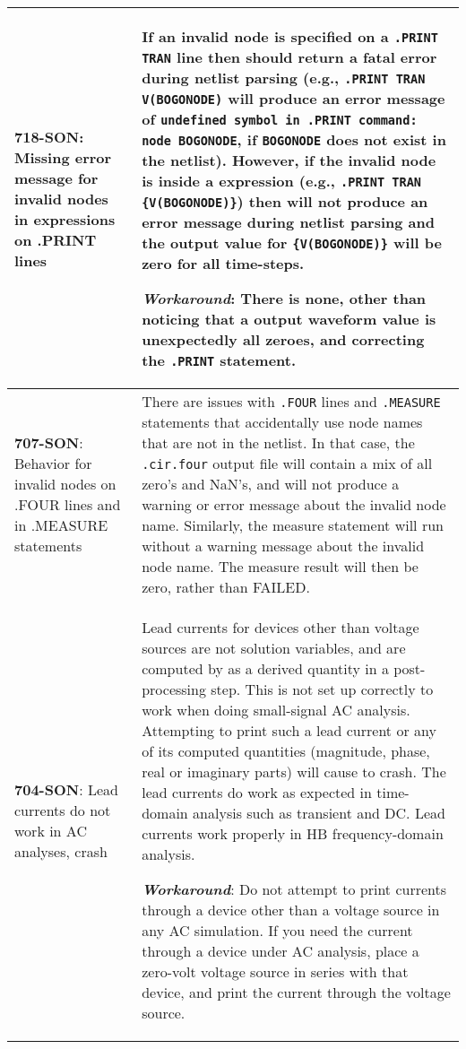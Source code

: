 {\begin{longtable}[h] {>{\raggedright\small}m{2in}|>{\raggedright\let\\\tabularnewline\small}m{3.5in}}
\textbf{718-SON}: Missing error message for invalid nodes in expressions on .PRINT lines & If an invalid node
is specified on a \Xyce{} \texttt{.PRINT TRAN} line then \Xyce{} should return a fatal error during netlist
parsing (e.g., \texttt{.PRINT TRAN V(BOGONODE)} will produce an error message of \texttt{undefined 
symbol in .PRINT command: node BOGONODE}, if \texttt{BOGONODE} does not exist in the netlist).  However, if the
invalid node is inside a \Xyce{} expression (e.g., \texttt{.PRINT TRAN \{V(BOGONODE)\}}) then \Xyce{} will 
not produce an error message during netlist parsing and the output value for \texttt{\{V(BOGONODE)\}} will 
be zero for all time-steps.

\textbf{\textit{Workaround}}: There is none, other than noticing that a output waveform value is unexpectedly all zeroes,
and correcting the \texttt{.PRINT} statement. \\ \hline

\textbf{707-SON}: Behavior for invalid nodes on .FOUR lines and in .MEASURE statements &
There are issues with \texttt{.FOUR} lines and \texttt{.MEASURE} statements that accidentally
use node names that are not in the netlist.  In that case, the \texttt{.cir.four} output file 
will contain a mix of all zero's and NaN's, and \Xyce{} will not produce a warning or error 
message about the invalid node name.  Similarly, the measure statement will run without a 
warning message about the invalid node name.  The measure result will then be zero, rather than 
FAILED. \\ \hline

\textbf{704-SON}: Lead currents do not work in AC analyses, crash \Xyce{} & Lead currents for devices other than voltage sources are not solution variables, and are computed by \Xyce{} as a derived quantity in a post-processing step.  This is not set up correctly to work when doing small-signal AC analysis.  Attempting to print such a lead current or any of its computed quantities (magnitude, phase, real or imaginary parts) will cause \Xyce{} to crash.  The lead currents do work as expected in time-domain analysis such as transient and DC.  Lead currents work properly in HB frequency-domain analysis.

\textbf{\textit{Workaround}}: Do not attempt to print currents through a device other than a voltage source in any AC simulation.  If you need the current through a device under AC analysis, place a zero-volt voltage source in series with that device, and print the current through the voltage source.  
\\ \hline


\end{longtable}}
